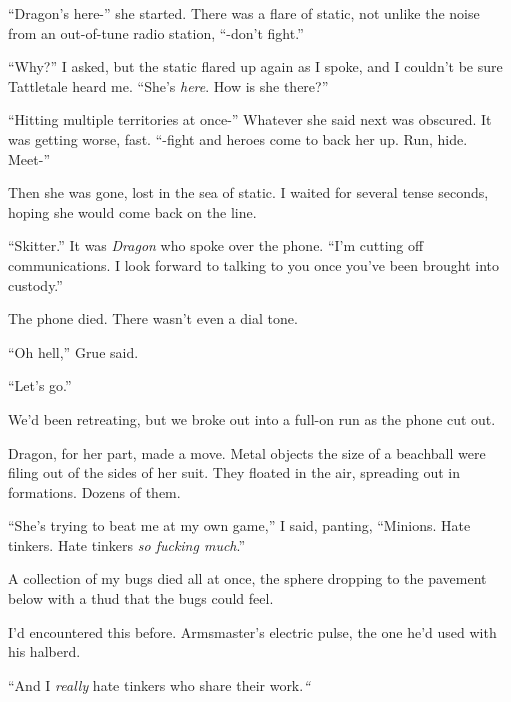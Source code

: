 ``Dragon's here-'' she started.  There was a flare of static, not unlike the noise from an out-of-tune radio station, ``-don't fight.''



``Why?'' I asked, but the static flared up again as I spoke, and I couldn't be sure Tattletale heard me.  ``She's \emph{here}.  How is she there?''



``Hitting multiple territories at once-'' Whatever she said next was obscured.  It was getting worse, fast.  ``-fight and heroes come to back her up.  Run, hide.  Meet-''



Then she was gone, lost in the sea of static.  I waited for several tense seconds, hoping she would come back on the line.



``Skitter.''  It was \emph{Dragon} who spoke over the phone.  ``I'm cutting off communications.  I look forward to talking to you once you've been brought into custody.''



The phone died.  There wasn't even a dial tone.



``Oh hell,'' Grue said.



``Let's go.''



We'd been retreating, but we broke out into a full-on run as the phone cut out.



Dragon, for her part, made a move.  Metal objects the size of a beachball were filing out of the sides of her suit.  They floated in the air, spreading out in formations.  Dozens of them.



``She's trying to beat me at my own game,'' I said, panting, ``Minions.  Hate tinkers.  Hate tinkers \emph{so fucking much}.''



A collection of my bugs died all at once, the sphere dropping to the pavement below with a thud that the bugs could feel.



I'd encountered this before.  Armsmaster's electric pulse, the one he'd used with his halberd.



``And I \emph{really} hate tinkers who share their work.\emph{``}



